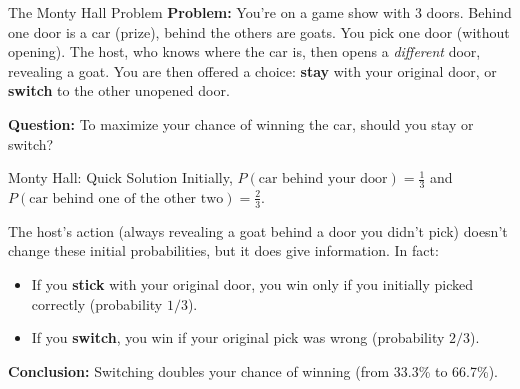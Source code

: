 \documentclass[aspectratio=169,11pt]{beamer} %
\begin{document}
\begin{frame}[fragile]{The Monty Hall Problem}
\textbf{Problem:} You're on a game show with 3 doors. Behind one door is a car (prize), behind the others are goats. You pick one door (without opening). The host, who knows where the car is, then opens a \emph{different} door, revealing a goat. You are then offered a choice: \textbf{stay} with your original door, or \textbf{switch} to the other unopened door. \newline

\textbf{Question:} To maximize your chance of winning the car, should you stay or switch?
\end{frame}

\begin{frame}[fragile]{Monty Hall: Quick Solution}
Initially, $P(\text{car behind your door}) = \frac{1}{3}$ and $P(\text{car behind one of the other two}) = \frac{2}{3}$. \newline

The host's action (always revealing a goat behind a door you didn't pick) doesn't change these initial probabilities, but it does give information. In fact:
\begin{itemize}
    \item If you \textbf{stick} with your original door, you win only if you initially picked correctly (probability $1/3$).
    \item If you \textbf{switch}, you win if your original pick was wrong (probability $2/3$).
\end{itemize}
\textbf{Conclusion:} Switching doubles your chance of winning (from 33.3\% to 66.7\%). 
\end{frame}
\end{document}
